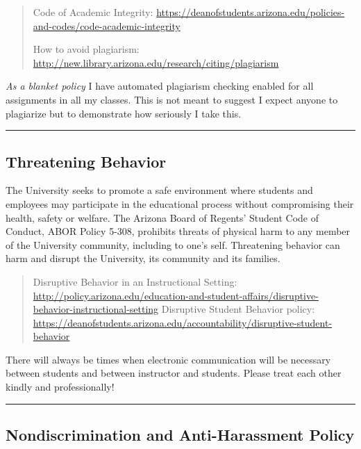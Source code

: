\documentclass[]{article}
\begin{document}
\begin{quote}
Code of Academic Integrity:
\url{https://deanofstudents.arizona.edu/policies-and-codes/code-academic-integrity}

How to avoid plagiarism:
\url{http://new.library.arizona.edu/research/citing/plagiarism}
\end{quote}

\emph{As a blanket policy} I have automated plagiarism checking enabled
for all assignments in all my classes. This is not meant to suggest I
expect anyone to plagiarize but to demonstrate how seriously I take
this.

\begin{center}\rule{0.5\linewidth}{\linethickness}\end{center}

\hypertarget{threatening-behavior}{%
\subsection{Threatening Behavior}\label{threatening-behavior}}

The University seeks to promote a safe environment where students and
employees may participate in the educational process without
compromising their health, safety or welfare. The Arizona Board of
Regents' Student Code of Conduct, ABOR Policy 5-308, prohibits threats
of physical harm to any member of the University community, including to
one's self. Threatening behavior can harm and disrupt the University,
its community and its families.

\begin{quote}
Disruptive Behavior in an Instructional Setting:
\url{http://policy.arizona.edu/education-and-student-affairs/disruptive-behavior-instructional-setting}
Disruptive Student Behavior policy:
\url{https://deanofstudents.arizona.edu/accountability/disruptive-student-behavior}
\end{quote}

There will always be times when electronic communication will be
necessary between students and between instructor and students. Please
treat each other kindly and professionally!

\begin{center}\rule{0.5\linewidth}{\linethickness}\end{center}

\hypertarget{nondiscrimination-and-anti-harassment-policy}{%
\subsection{Nondiscrimination and Anti-Harassment
Policy}\label{nondiscrimination-and-anti-harassment-policy}}
\end{document}

